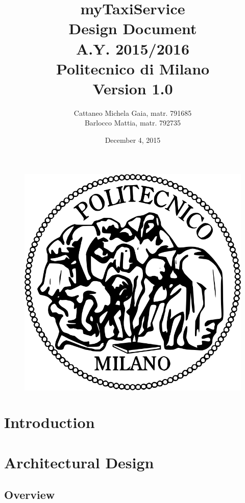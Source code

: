 \documentclass[18pt,oneside,a4paper, titlepage]{article}
\begin{document}
\begin{figure}[t]
	\centering
	\includegraphics[scale=0.35]{logo-polimi.png}
\end{figure}
\title{\textbf{myTaxiService}\\\textbf{D}esign \textbf{D}ocument\\ A.Y. 2015/2016\\
	Politecnico di Milano \\ Version 1.0}	
\author{Cattaneo Michela Gaia, matr. 791685\\Barlocco Mattia, matr. 792735 }
\date{December 4, 2015}
\maketitle

\newpage
	\tableofcontents

\newpage
	\section{Introduction}
		
	\section{Architectural Design}
		\subsection{Overview}
\end{document}
